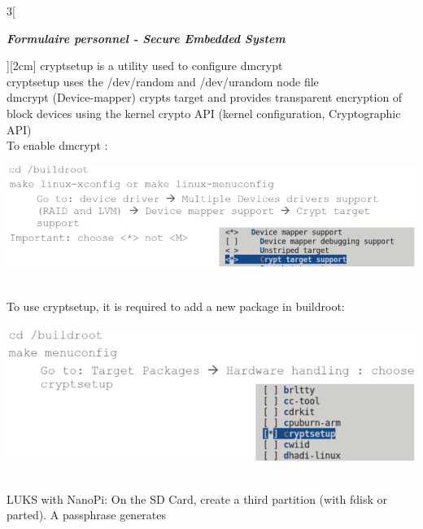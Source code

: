 \begin{multicols}{3}[\centerline{ \large\em \textbf{Formulaire personnel - Secure Embedded System}}][2cm]
cryptsetup is a utility used to configure dmcrypt\\
cryptsetup uses the /dev/random and /dev/urandom node file\\
dmcrypt (Device-mapper) crypts target and provides transparent encryption of block devices using the kernel crypto API (kernel configuration, Cryptographic API)\\
To enable dmcrypt :\\
\begin{minipage}{\linewidth}
	\centering
    \includegraphics[width =\columnwidth]{images/34.png}
\end{minipage}\\
To use cryptsetup, it is required to add a new package in buildroot:\\
\begin{minipage}{\linewidth}
	\centering
    \includegraphics[width =0.8\columnwidth]{images/35.png}
\end{minipage}\\
LUKS with NanoPi: On the SD Card, create a third partition (with fdisk or parted). A passphrase generates\\


\end{multicols}
